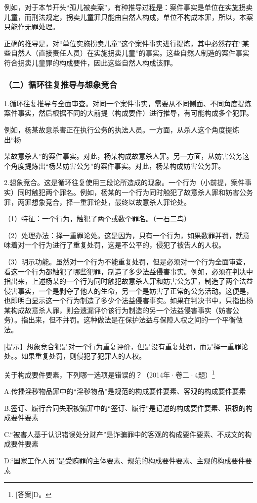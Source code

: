 例如，对于本节开头“孤儿被卖案”，有种推导过程是：案件事实是单位在实施拐卖儿童，而刑法规定，拐卖儿童罪只能由自然人构成，单位不构成本罪，所以，本案只能作无罪处理。

正确的推导是，对“单位实施拐卖儿童”这个案件事实进行提炼，其中必然存在“某些自然人（直接责任人员）在实施拐卖儿童”的事实。这些自然人制造的案件事实符合拐卖儿童罪的构成要件，因此这些自然人构成该罪。

\subsubsection*{（二）循环往复推导与想象竞合}

1.循环往复推导与全面审查。对同一个案件事实，需要从不同侧面、不同角度提炼案件事实，然后根据不同的大前提（构成要件）进行推导，有可能构成多个犯罪。

例如，杨某故意杀害正在执行公务的执法人员。一方面，从杀人这个角度提炼出“杨

某故意杀人”的案件事实。对此，杨某构成故意杀人罪。另一方面，从妨害公务这个角度提炼出“杨某妨害公务”的案件事实。对此，杨某构成妨害公务罪。

2.想象竞合。这是循环往复使用三段论所造成的现象。一个行为（小前提，案件事实）同时触犯两个罪名。例如，杨某的一个行为同时触犯了故意杀人罪和妨害公务罪，两罪想象竞合，择一重罪论处，最终以故意杀人罪论处。

（1）特征：一个行为，触犯了两个或数个罪名。（一石二鸟）

（2）处理办法：择一重罪论处。这是因为，只有一个行为，如果数罪并罚，就意味着对一个行为进行了重复处罚，这是不公平的，侵犯了被告人的人权。

（3）明示功能。虽然对一个行为不能重复处罚，但是必须对一个行为全面审查，看这一个行为都触犯了哪些犯罪，制造了多少法益侵害事实。例如，必须在判决中指出来，上述杨某的一个行为同时触犯故意杀人罪和妨害公务罪，制造了两个法益侵害事实，一个是剥夺了他人的生命，另一个是妨害了正常的公务活动。这便是，也即明白显示这一个行为制造了多少个法益侵害事实。如果在判决书中，只指出杨某构成故意杀人罪，则会遗漏评价该行为制造的另一个法益侵害事实（妨害公务）。指出来，但不并罚。这种做法是在保护法益与保障人权之间的一个平衡做法。

[提示】想象竞合犯是对一个行为重复评价，但是没有重复处罚，而是择一重罪论处。。如果重复处罚，则侵犯了犯罪人的人权。


关于构成要件要素，下列哪一选项是错误的？（2014年·卷二·4题）\footnote{[答案]D。}

A.传播淫秽物品罪中的“淫秽物品”是规范的构成要件要素、客观的构成要件要素

B.签订、履行合同失职被骗罪中的“签订、履行”是记述的构成要件要素、积极的构成要件要素

C.“被害人基于认识错误处分财产”是诈骗罪中的客观的构成要件要素、不成文的构成要件要素

D.“国家工作人员”是受贿罪的主体要素、规范的构成要件要素、主观的构成要件要素


